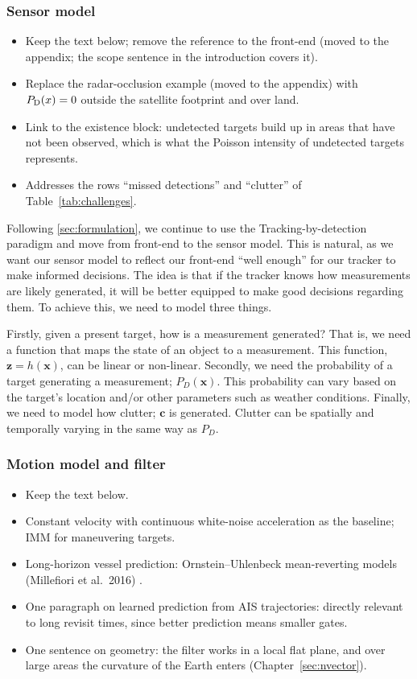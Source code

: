 \subsubsection{Sensor model}
\begin{itemize}
    \item Keep the text below; remove the reference to the front-end (moved to the appendix; the scope sentence in the introduction covers it).
    \item Replace the radar-occlusion example (moved to the appendix) with $P_{\mathrm{D}}(x) = 0$ outside the satellite footprint and over land.
    \item Link to the existence block: undetected targets build up in areas that have not been observed, which is what the Poisson intensity of undetected targets represents.
    \item Addresses the rows ``missed detections'' and ``clutter'' of Table~\ref{tab:challenges}.
\end{itemize}

Following \autoref{sec:formulation}, we continue to use the Tracking-by-detection paradigm and move from front-end to the sensor model. This is natural, as we want our sensor model to reflect our front-end ``well enough'' for our tracker to make informed decisions. The idea is that if the tracker knows how measurements are likely generated, it will be better equipped to make good decisions regarding them. To achieve this, we need to model three things.
\medskip

Firstly, given a present target, how is a measurement generated? That is, we need a function that maps the state of an object to a measurement. This function, $\mathbf{z} = h(\mathbf{x})$, can be linear or non-linear. Secondly, we need the probability of a target generating a measurement; $P_D(\mathbf{x})$. This probability can vary based on the target's location and/or other parameters such as weather conditions. Finally, we need to model how clutter; $\mathbf{c}$ is generated. Clutter can be spatially and temporally varying in the same way as $P_D$.
\medskip

\subsubsection{Motion model and filter}
\begin{itemize}
    \item Keep the text below.
    \item Constant velocity with continuous white-noise acceleration as the baseline; IMM for maneuvering targets.
    \item Long-horizon vessel prediction: Ornstein--Uhlenbeck mean-reverting models (Millefiori et al.\ 2016) .
    \item One paragraph on learned prediction from AIS trajectories: directly relevant to long revisit times, since better prediction means smaller gates.
    \item One sentence on geometry: the filter works in a local flat plane, and over large areas the curvature of the Earth enters (Chapter~\ref{sec:nvector}).
\end{itemize}

